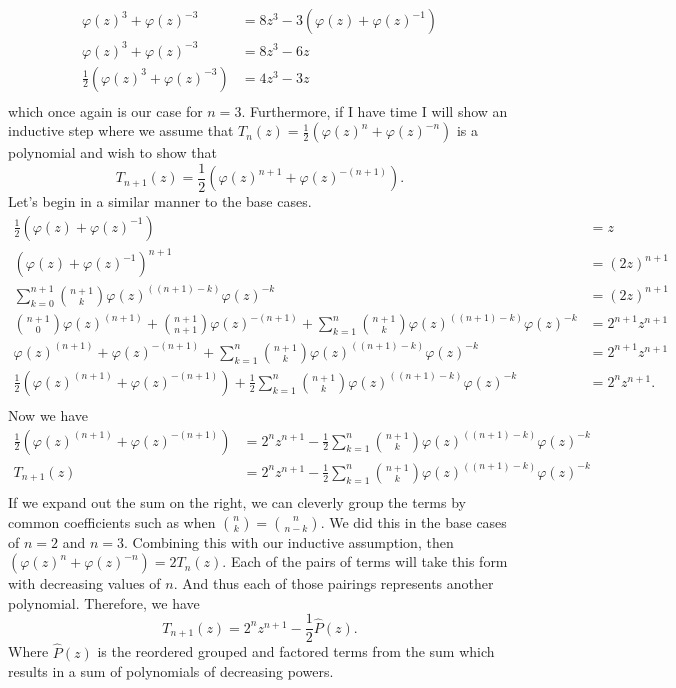 \documentclass[10pt]{amsart}
\theoremstyle{nonumberplain}
\begin{document}
\begin{enumerate}[label={\bf {\arabic*}:}]
\begin{align*}
\varphi(z)^3 + \varphi(z)^{-3} &= 8z^3 - 3\left(\varphi(z) + \varphi(z)^{-1}\right) \\
\varphi(z)^3 + \varphi(z)^{-3} &= 8z^3 - 6z \\
\frac 1 2 \left(\varphi(z)^3 + \varphi(z)^{-3}\right) &= 4z^3 - 3z \\
\end{align*}
which once again is our case for $n=3$.
Furthermore, if I have time I will show an inductive step where we assume that 
$T_n(z) = \frac 1 2 \left( \varphi(z)^n + \varphi(z)^{-n} \right)$ is a polynomial and wish to show that
$$
T_{n+1}(z) = \frac 1 2 \left( \varphi(z)^{n+1} + \varphi(z)^{-(n+1)} \right).
$$
Let's begin in a similar manner to the base cases.
\begin{align*}
\frac 1 2 \left( \varphi(z) + \varphi(z)^{-1} \right) &= z \\
\left( \varphi(z) + \varphi(z)^{-1} \right)^{n + 1} &= (2z)^{n + 1} \\
\sum_{k= 0}^{n + 1} \binom{n + 1}{k} \varphi(z)^{((n + 1) - k)} \varphi(z)^{-k} &= (2z)^{n + 1} \\
\binom{n + 1}{0} \varphi(z)^{(n + 1)} + \binom{n + 1}{n + 1} \varphi(z)^{-(n + 1)} + \sum_{k= 1}^{n} \binom{n + 1}{k} \varphi(z)^{((n + 1) - k)} \varphi(z)^{-k} &= 2^{n + 1}z^{n + 1} \\
\varphi(z)^{(n + 1)} + \varphi(z)^{-(n + 1)} + \sum_{k= 1}^{n} \binom{n + 1}{k} \varphi(z)^{((n + 1) - k)} \varphi(z)^{-k} &= 2^{n + 1}z^{n + 1} \\
\frac 1 2 \left(\varphi(z)^{(n + 1)} + \varphi(z)^{-(n + 1)}\right) + \frac 1 2 \sum_{k= 1}^{n} \binom{n + 1}{k} \varphi(z)^{((n + 1) - k)} \varphi(z)^{-k} &= 2^nz^{n + 1}. \\
\end{align*}
Now we have
\begin{align*}
\frac 1 2 \left(\varphi(z)^{(n + 1)} + \varphi(z)^{-(n + 1)}\right) &= 2^nz^{n + 1} - \frac 1 2 \sum_{k= 1}^{n} \binom{n + 1}{k} \varphi(z)^{((n + 1) - k)} \varphi(z)^{-k} \\
T_{n+1}(z) &= 2^nz^{n + 1} - \frac 1 2 \sum_{k= 1}^{n} \binom{n + 1}{k} \varphi(z)^{((n + 1) - k)} \varphi(z)^{-k} \\
\end{align*}
If we expand out the sum on the right, we can cleverly group the terms by common coefficients such as when $\binom{n}{k} = \binom{n}{n - k}$.
We did this in the base cases of $n=2$ and $n=3$.
Combining this with our inductive assumption, then $\left( \varphi(z)^n + \varphi(z)^{-n} \right) = 2T_n(z)$.
Each of the pairs of terms will take this form with decreasing values of $n$.
And thus each of those pairings represents another polynomial.
Therefore, we have $$T_{n+1}(z) = 2^nz^{n + 1} - \frac 1 2 \hat P(z).$$
Where $\hat P(z)$ is the reordered grouped and factored terms from the sum which results in a sum of polynomials of decreasing powers.
\\


\end{enumerate}
\end{document}
